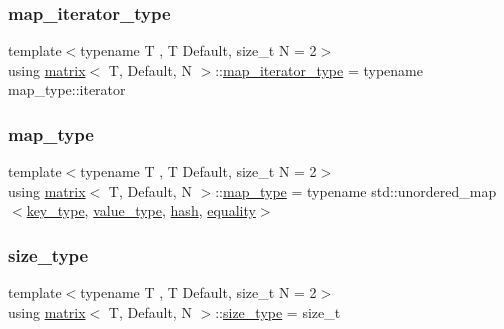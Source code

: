 \mbox{\label{structmatrix_a73d7dc1f59c66d8fede2107be5ff190d}} 
\subsubsection{\texorpdfstring{map\+\_\+iterator\+\_\+type}{map\_iterator\_type}}
{\footnotesize\ttfamily template$<$typename T , T Default, size\+\_\+t N = 2$>$ \\
using \hyperlink{structmatrix}{matrix}$<$ T, Default, N $>$\+::\hyperlink{structmatrix_a73d7dc1f59c66d8fede2107be5ff190d}{map\+\_\+iterator\+\_\+type} =  typename map\+\_\+type\+::iterator}

\mbox{\label{structmatrix_af76ef63f3afb1e21eb859bc3ff0885fb}} 
\subsubsection{\texorpdfstring{map\+\_\+type}{map\_type}}
{\footnotesize\ttfamily template$<$typename T , T Default, size\+\_\+t N = 2$>$ \\
using \hyperlink{structmatrix}{matrix}$<$ T, Default, N $>$\+::\hyperlink{structmatrix_af76ef63f3afb1e21eb859bc3ff0885fb}{map\+\_\+type} =  typename std\+::unordered\+\_\+map$<$\hyperlink{structmatrix_ae7906bda02f5d7f6744d9545c9465e13}{key\+\_\+type}, \hyperlink{structmatrix_aeb660563444929ee10d8a0b06d42a951}{value\+\_\+type}, \hyperlink{structmatrix_1_1hash}{hash}, \hyperlink{structmatrix_1_1equality}{equality}$>$}

\mbox{\label{structmatrix_a1a99bcb39d34cb8acd10a5d1a260542b}} 
\subsubsection{\texorpdfstring{size\+\_\+type}{size\_type}}
{\footnotesize\ttfamily template$<$typename T , T Default, size\+\_\+t N = 2$>$ \\
using \hyperlink{structmatrix}{matrix}$<$ T, Default, N $>$\+::\hyperlink{structmatrix_a1a99bcb39d34cb8acd10a5d1a260542b}{size\+\_\+type} =  size\+\_\+t}

